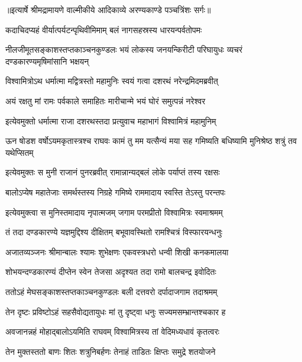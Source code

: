 {॥इत्यार्षे श्रीमद्रामायणे वाल्मीकीये आदिकाव्ये अरण्यकाण्डे पञ्चत्रिंशः सर्गः॥}


\twolineshloka
{कदाचिदप्यहं वीर्यात्पर्यटन्पृथिवीमिमाम्}
{बलं नागसहस्रस्य धारयन्पर्वतोपमः} %

\threelineshloka
{नीलजीमूतसङ्काशस्तप्तकाञ्चनकुण्डलः}
{भयं लोकस्य जनयन्किरीटी परिघायुधः}
{व्यचरं दण्डकारण्यमृषिमांसानि भक्षयन्} %

\twolineshloka
{विश्वामित्रोऽथ धर्मात्मा मद्वित्रस्तो महामुनिः}
{स्वयं गत्वा दशरथं नरेन्द्रमिदमब्रवीत्} %

\twolineshloka
{अयं रक्षतु मां रामः पर्वकाले समाहितः}
{मारीचान्मे भयं घोरं समुत्पन्नं नरेश्वर} %

\twolineshloka
{इत्येवमुक्तो धर्मात्मा राजा दशरथस्तदा}
{प्रत्युवाच महाभागं विश्वामित्रं महामुनिम्} %

\threelineshloka
{ऊन षोडश वर्षोऽयमकृतास्त्रश्च राघवः}
{कामं तु मम यत्सैन्यं मया सह गमिष्यति}
{बधिष्यामि मुनिश्रेष्ठ शत्रुं तव यथेप्सितम्} %

\twolineshloka
{इत्येवमुक्तः स मुनी राजानं पुनरब्रवीत्}
{रामान्नान्यद्बलं लोके पर्याप्तं तस्य रक्षसः} %

\twolineshloka
{बालोऽप्येष महातेजाः समर्थस्तस्य निग्रहे}
{गमिष्ये राममादाय स्वस्ति तेऽस्तु परन्तपः} %

\twolineshloka
{इत्येवमुक्त्वा स मुनिस्तमादाय नृपात्मजम्}
{जगाम परमप्रीतो विश्वामित्रः स्वमाश्रमम्} %

\twolineshloka
{तं तदा दण्डकारण्ये यज्ञमुद्दिश्य दीक्षितम्}
{बभूवावस्थितो रामश्चित्रं विस्फारयन्धनुः} %

\twolineshloka
{अजातव्यञ्जनः श्रीमान्बालः श्यामः शुभेक्षणः}
{एकवस्त्रधरो धन्वी शिखी कनकमालया} %

\twolineshloka
{शोभयन्दण्डकारण्यं दीप्तेन स्वेन तेजसा}
{अदृश्यत तदा रामो बालचन्द्र इवोदितः} %

\twolineshloka
{ततोऽहं मेघसङ्काशस्तप्तकाञ्चनकुण्डलः}
{बली दत्तवरो दर्पादाजगाम तदाश्रमम्} %

\twolineshloka
{तेन दृष्टः प्रविष्टोऽहं सहसैवोद्यतायुधः}
{मां तु दृष्ट्वा धनुः सज्यमसम्भ्रान्तश्चकार ह} %

\twolineshloka
{अवजानन्नहं मोहाद्बालोऽयमिति राघवम्}
{विश्वामित्रस्य तां वेदिमध्यधावं कृतत्वरः} %

\twolineshloka
{तेन मुक्तस्ततो बाणः शितः शत्रुनिबर्हणः}
{तेनाहं ताडितः क्षिप्तः समुद्रे शतयोजने} %

